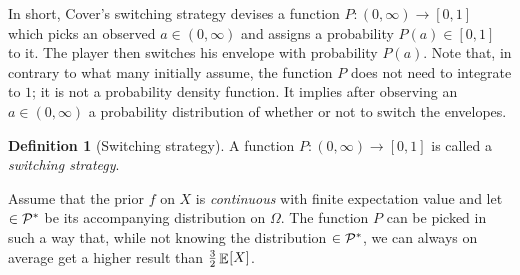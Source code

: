 \documentclass[a4paper]{report}
\theoremstyle{plain}
\theoremstyle{definition}
\newtheorem{definition}[theorem]{Definition}
\theoremstyle{remark}
\numberwithin{equation}{chapter}
\let\P\relax
\DeclareMathOperator{\P}{\mathbb{P}}
\DeclareMathOperator{\E}{\mathbb{E}}
\DeclareMathOperator{\1}{\mathbbm{1}}
\newcommand{\Pmod}{\mathcal{P}^*}
\begin{document}
In short, Cover's switching strategy devises a function $P\colon(0,\infty)\to[0,1]$ which picks an observed $a\in(0,\infty)$ and assigns a probability $P(a)\in[0,1]$ to it. The player then switches his envelope with probability $P(a)$. Note that, in contrary to what many initially assume, the function $P$ does not need to integrate to $1$; it is not a probability density function. It implies after observing an $a\in(0,\infty)$ a probability distribution of whether or not to switch the envelopes.

\begin{definition}[Switching strategy]
A function $P\colon(0,\infty)\to[0,1]$ is called a \emph{switching strategy}.
\end{definition}

Assume that the prior $f$ on $X$ is \emph{continuous} with finite expectation value and let $\P\in\Pmod$ be its accompanying distribution on $\Omega$. The function $P$ can be picked in such a way that, while not knowing the distribution $\P\in\Pmod$, we can always on average get a higher result than $\frac{3}{2}\E_{\P}[X]$.
\end{document}
